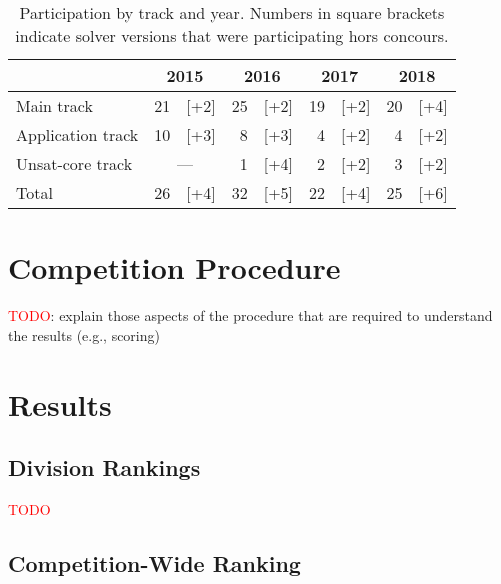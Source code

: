 \documentclass[twoside,11pt]{article}
\newcommand{\TODO}[0]{\textcolor{red}{TODO}}
\begin{document}
\begin{table}
  \caption{Participation by track and year.  Numbers in square
    brackets indicate solver versions that were participating hors
    concours.}
  \label{table:participation-by-track}
  \centering
  \begin{tabular}{|l|r@{\,\,}r|r@{\,\,}r|r@{\,\,}r|r@{\,\,}r|}
    \hline
                      & \multicolumn{2}{c|}{2015} & \multicolumn{2}{c|}{2016} & \multicolumn{2}{c|}{2017} & \multicolumn{2}{c|}{2018} \\
    \hline
    Main track        & 21 &                [+2] & 25 & [+2] & 19 & [+2] & 20 & [+4] \\
    Application track & 10 &                [+3] &  8 & [+3] &  4 & [+2] &  4 & [+2] \\
    Unsat-core track  & \multicolumn{2}{c|}{---} &  1 & [+4] &  2 & [+2] &  3 & [+2] \\
    \hline
    Total             & 26 &                [+4] & 32 & [+5] & 22 & [+4] & 25 & [+6] \\
    \hline
  \end{tabular}
\end{table}


\section{Competition Procedure}
\label{sec:procedure}

\TODO: explain those aspects of the procedure that are required to
understand the results (e.g., scoring)


\section{Results}
\label{sec:results}

\subsection{Division Rankings}
\label{sec:division-rankings}

\TODO


\subsection{Competition-Wide Ranking}
\label{sec:floc}
\end{document}

